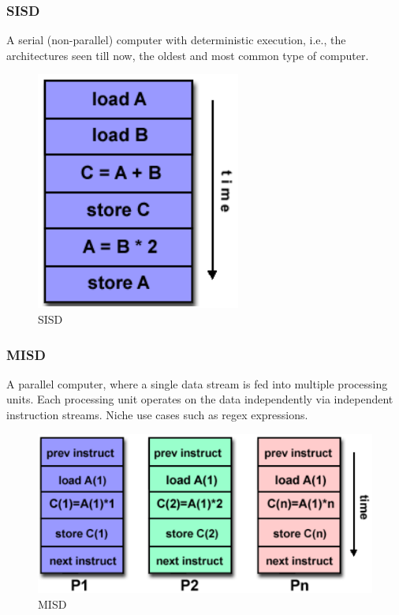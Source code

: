 \subsubsection{SISD}
A serial (non-parallel) computer with deterministic execution, i.e., the architectures seen till now, the oldest and
most common type of computer.
\begin{figure}[h]
    \centering
    \includegraphics[scale = 0.3]{images/sisd}
    \caption{SISD}
    \label{fig:sisd}
\end{figure}

\subsubsection{MISD}
A parallel computer, where a single data stream is fed into multiple processing units.
Each processing unit operates on the data independently via independent instruction streams.
Niche use cases such as regex expressions.
\begin{figure}[H]
    \centering
    \includegraphics[scale = 0.3]{images/misd}
    \caption{MISD}
    \label{fig:misd}
\end{figure}


